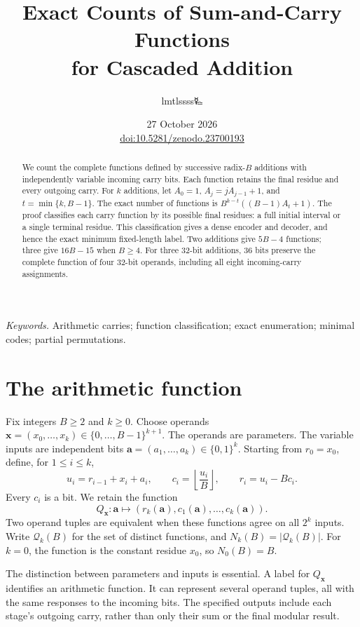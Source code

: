 \documentclass[11pt,a4paper]{article}
\title{\LARGE Exact Counts of Sum-and-Carry Functions\\for Cascaded Addition}
\author{lmtlssss{\authorsymbol 🜐}}
\date{27 October 2026\\[3pt]{\small\href{https://doi.org/10.5281/zenodo.23700193}{doi:10.5281/zenodo.23700193}}}
\theoremstyle{definition}\newtheorem{definition}[theorem]{Definition}
\newcommand{\Q}{\mathcal Q}
\newcommand{\abits}{\boldsymbol a}
\newcommand{\xvec}{\boldsymbol x}
\begin{document}
\maketitle\thispagestyle{plain}
\begin{abstract}
We count the complete functions defined by successive radix-$B$ additions
with independently variable incoming carry bits. Each function retains the
final residue and every outgoing carry. For $k$ additions, let
$A_0=1$, $A_j=jA_{j-1}+1$, and $t=\min\{k,B-1\}$.
The exact number of functions is
$B^{k-t}((B-1)A_t+1)$.
The proof classifies each carry function by its possible final residues:
a full initial interval or a single terminal residue.
This classification gives a dense encoder and decoder, and hence the exact
minimum fixed-length label. Two additions give $5B-4$ functions; three give
$16B-15$ when $B\geq4$.
For three 32-bit additions, 36 bits preserve the complete function of four
32-bit operands, including all eight incoming-carry assignments.
\end{abstract}
\noindent\textit{Keywords.} Arithmetic carries; function classification;
exact enumeration; minimal codes; partial permutations.

\section{The arithmetic function}
Fix integers $B\geq2$ and $k\geq0$. Choose operands
$\xvec=(x_0,\ldots,x_k)\in\{0,\ldots,B-1\}^{k+1}$.
The operands are parameters. The variable inputs are independent bits
$\abits=(a_1,\ldots,a_k)\in\{0,1\}^k$.
Starting from $r_0=x_0$, define, for $1\leq i\leq k$,
\begin{equation}\label{eq:operation}
 u_i=r_{i-1}+x_i+a_i,\qquad
 c_i=\left\lfloor\frac{u_i}{B}\right\rfloor,\qquad
 r_i=u_i-Bc_i.
\end{equation}
Every $c_i$ is a bit. We retain the function
\begin{equation}\label{eq:function}
 Q_{\xvec}:\abits\longmapsto
      (r_k(\abits),c_1(\abits),\ldots,c_k(\abits)).
\end{equation}
Two operand tuples are equivalent when these functions agree on all
$2^k$ inputs. Write $\Q_k(B)$ for the set of distinct functions, and
$N_k(B)=|\Q_k(B)|$. For $k=0$, the function is the constant residue $x_0$,
so $N_0(B)=B$.

The distinction between parameters and inputs is essential. A label for
$Q_{\xvec}$ identifies an arithmetic function. It can represent several
operand tuples, all with the same responses to the incoming bits.
The specified outputs include each stage's outgoing carry, rather than only
their sum or the final modular result.
\end{document}
